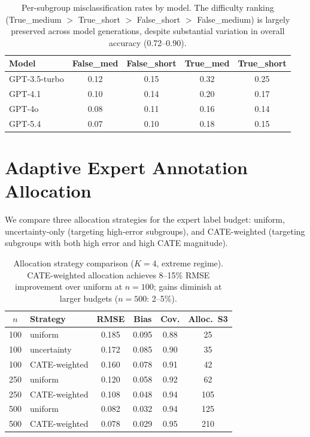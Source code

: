 \documentclass[11pt]{article}
\begin{document}
\begin{table}[h]
\centering
\small
\begin{tabular}{lcccc}
\toprule
Model & False\_med & False\_short & True\_med & True\_short \\
\midrule
GPT-3.5-turbo & 0.12 & 0.15 & 0.32 & 0.25 \\
GPT-4.1 & 0.10 & 0.14 & 0.20 & 0.17 \\
GPT-4o & 0.08 & 0.11 & 0.16 & 0.14 \\
GPT-5.4 & 0.07 & 0.10 & 0.18 & 0.15 \\
\bottomrule
\end{tabular}
\caption{Per-subgroup misclassification rates by model. The difficulty ranking (True\_medium $>$ True\_short $>$ False\_short $>$ False\_medium) is largely preserved across model generations, despite substantial variation in overall accuracy (0.72--0.90).}
\label{tab:multi_llm_detail}
\end{table}

\section{Adaptive Expert Annotation Allocation}
\label{app:allocation}

We compare three allocation strategies for the expert label budget: uniform, uncertainty-only (targeting high-error subgroups), and CATE-weighted (targeting subgroups with both high error and high CATE magnitude).

\begin{table}[h]
\centering
\small
\begin{tabular}{clcccc}
\toprule
$n$ & Strategy & RMSE & Bias & Cov. & Alloc.\ S3 \\
\midrule
100 & uniform & 0.185 & 0.095 & 0.88 & 25 \\
100 & uncertainty & 0.172 & 0.085 & 0.90 & 35 \\
100 & CATE-weighted & 0.160 & 0.078 & 0.91 & 42 \\
250 & uniform & 0.120 & 0.058 & 0.92 & 62 \\
250 & CATE-weighted & 0.108 & 0.048 & 0.94 & 105 \\
500 & uniform & 0.082 & 0.032 & 0.94 & 125 \\
500 & CATE-weighted & 0.078 & 0.029 & 0.95 & 210 \\
\bottomrule
\end{tabular}
\caption{Allocation strategy comparison ($K{=}4$, extreme regime). CATE-weighted allocation achieves 8--15\% RMSE improvement over uniform at $n{=}100$; gains diminish at larger budgets ($n{=}500$: 2--5\%).}
\label{tab:allocation}
\end{table}
\end{document}
